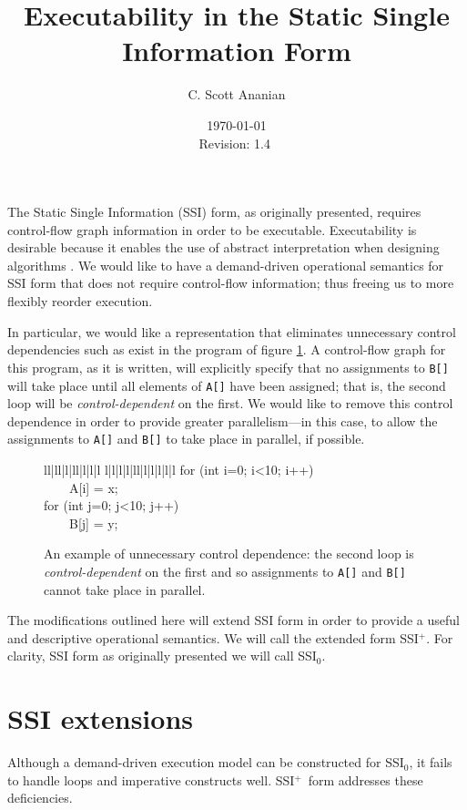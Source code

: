 \documentclass[12pt,notitlepage,twoside]{article}
\title{Executability in the Static Single Information Form}
\author{C. Scott Ananian}
\date{\today \\ $ $Revision: 1.4 $ $}
\newenvironment{samplecode}[1][1]
  {\setlength{\tabcolsep}{2\tabcolsep}%
\renewcommand{\>}{~~~~}%
\newcommand{\comment}[1]{\rm\it // ##1}%
\newcommand{\com}[1]{\comment{##1}}%
\newcommand{\ells}[1]{\ifcase#1\or l\or l|l\or l|l|l\or l|l|l|l\or
l|l|l|l|l\or l|l|l|l|l|l\fi}%
\begin{center}\tt\begin{tabular}{\ells{#1}}}
  {\end{tabular}\end{center}}
\newcommand{\ssizero}{SSI$_0$}
\newcommand{\ssiplus}{SSI$^+$}
\begin{document}


\maketitle

The Static Single Information (SSI) form, as originally presented,
requires control-flow graph information in order to be executable.
Executability is desirable because it enables the use of abstract
interpretation when designing algorithms \cite{pingali90:dfg}.  We
would like to have a demand-driven operational semantics for SSI form
that does not require control-flow information; thus freeing us to
more flexibly reorder execution.

In particular, we would like a representation that eliminates
unnecessary control dependencies such as exist in the program of
figure \ref{fig:ctrldep}.  A control-flow graph for this program, as
it is written, will explicitly specify that no assignments to
\texttt{B[]} will take place until all elements of \texttt{A[]} have
been assigned; that is, the second loop will be
\textit{control-dependent} on the first.  We would like to remove this
control dependence in order to provide greater parallelism---in this
case, to allow the assignments to \texttt{A[]} and \texttt{B[]} to
take place in parallel, if possible.

\begin{figure}[t]
\begin{samplecode}
for (int i=0; i<10; i++)\\
\>A[i] = x;\\
for (int j=0; j<10; j++)\\
\>B[j] = y;\\
\end{samplecode}
\caption{An example of unnecessary control dependence: the second loop
is \textit{control-dependent} on the first and so assignments to
\texttt{A[]} and \texttt{B[]} cannot take place in parallel.}
\label{fig:ctrldep}
\end{figure}

The modifications outlined here will extend SSI form in order to
provide a useful and descriptive operational semantics.  We will call
the extended form \ssiplus.  For clarity, SSI form as originally
presented we will call \ssizero.

\section{SSI extensions}
Although a demand-driven execution model can be constructed for
\ssizero,  it fails to handle loops and imperative
constructs well. \ssiplus\ form addresses these deficiencies.
\end{document}
